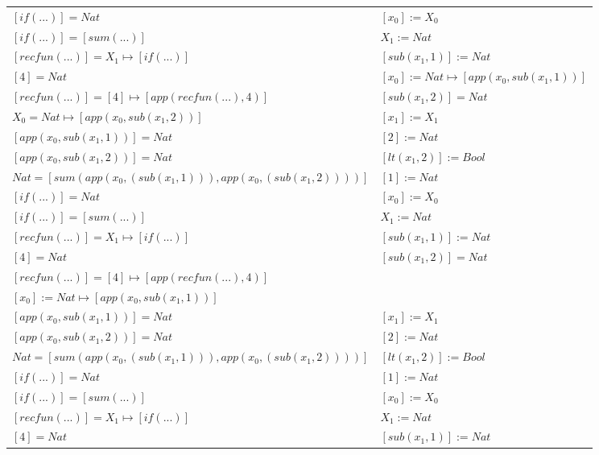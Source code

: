 \begin{exercise}
\begin{description}
\begin{center}
\begin{longtable}{ | l | l | }
                        $[if(...)] = Nat$ & $[x_0] := X_0$ \\
                        $[if(...)] = [sum(...)]$ & $X_1 := Nat$ \\
                        $[recfun(...)] = X_1 \mapsto [if(...)]$ & $[sub(x_1,1)] := Nat$ \\
                        $[4] = Nat$ &  $[x_0] := Nat \mapsto [app(x_0, sub(x_1,1))]$  \\
                        $[recfun(...)] = [4] \mapsto [app(recfun(...), 4)]$ &  $[sub(x_1,2)] = Nat$\\
                    \hline
                        $X_0 = Nat \mapsto [app(x_0, sub(x_1,2))]$ & $[x_1] := X_1$ \\
                        $[app(x_0, sub(x_1,1))] = Nat$ & $[2] := Nat$ \\
                        $[app(x_0, sub(x_1,2))] = Nat$ & $[lt(x_1 , 2)] := Bool$ \\
                        $Nat = [sum(app(x_0, (sub(x_1,1))), app(x_0, (sub(x_1,2))))]$ & $[1] := Nat$ \\
                        $[if(...)] = Nat$ & $[x_0] := X_0$ \\
                        $[if(...)] = [sum(...)]$ & $X_1 := Nat$  \\
                        $[recfun(...)] = X_1 \mapsto [if(...)]$ & $[sub(x_1,1)] := Nat$  \\
                        $[4] = Nat$ &  $[sub(x_1,2)] = Nat$ \\
                        $[recfun(...)] = [4] \mapsto [app(recfun(...), 4)]$ & \\
                        $[x_0] := Nat \mapsto [app(x_0, sub(x_1,1))]$ & \\
                    \hline
                        $[app(x_0, sub(x_1,1))] = Nat$ & $[x_1] := X_1$ \\
                        $[app(x_0, sub(x_1,2))] = Nat$ & $[2] := Nat$ \\
                        $Nat = [sum(app(x_0, (sub(x_1,1))), app(x_0, (sub(x_1,2))))]$ & $[lt(x_1 , 2)] := Bool$ \\
                        $[if(...)] = Nat$ & $[1] := Nat$ \\
                        $[if(...)] = [sum(...)]$ & $[x_0] := X_0$ \\
                        $[recfun(...)] = X_1 \mapsto [if(...)]$ & $X_1 := Nat$ \\
                        $[4] = Nat$ &  $[sub(x_1,1)] := Nat$ \\

\end{longtable}
\end{center}
\end{description}
\end{exercise}

